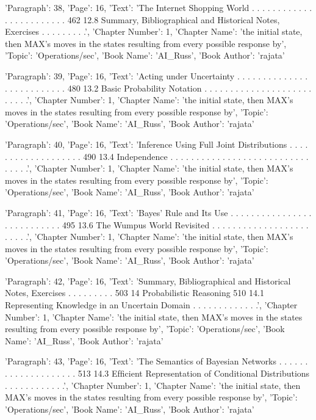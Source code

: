 {'Paragraph': 38, 'Page': 16, 'Text': 'The Internet Shopping World . . . . . . . . . . . . . . . . . . . . . . . . 462 12.8 Summary, Bibliographical and Historical Notes, Exercises . . . . . . . . .', 'Chapter Number': 1, 'Chapter Name': 'the initial state, then MAX’s moves in the states resulting from every possible response by', 'Topic': 'Operations/sec', 'Book Name': 'AI_Russ', 'Book Author': 'rajata'}

{'Paragraph': 39, 'Page': 16, 'Text': 'Acting under Uncertainty . . . . . . . . . . . . . . . . . . . . . . . . . . 480 13.2 Basic Probability Notation . . . . . . . . . . . . . . . . . . . . . . . . . .', 'Chapter Number': 1, 'Chapter Name': 'the initial state, then MAX’s moves in the states resulting from every possible response by', 'Topic': 'Operations/sec', 'Book Name': 'AI_Russ', 'Book Author': 'rajata'}

{'Paragraph': 40, 'Page': 16, 'Text': 'Inference Using Full Joint Distributions . . . . . . . . . . . . . . . . . . . 490 13.4 Independence . . . . . . . . . . . . . . . . . . . . . . . . . . . . . . . .', 'Chapter Number': 1, 'Chapter Name': 'the initial state, then MAX’s moves in the states resulting from every possible response by', 'Topic': 'Operations/sec', 'Book Name': 'AI_Russ', 'Book Author': 'rajata'}

{'Paragraph': 41, 'Page': 16, 'Text': 'Bayes’ Rule and Its Use . . . . . . . . . . . . . . . . . . . . . . . . . . . 495 13.6 The Wumpus World Revisited . . . . . . . . . . . . . . . . . . . . . . . .', 'Chapter Number': 1, 'Chapter Name': 'the initial state, then MAX’s moves in the states resulting from every possible response by', 'Topic': 'Operations/sec', 'Book Name': 'AI_Russ', 'Book Author': 'rajata'}

{'Paragraph': 42, 'Page': 16, 'Text': 'Summary, Bibliographical and Historical Notes, Exercises . . . . . . . . . 503 14 Probabilistic Reasoning 510 14.1 Representing Knowledge in an Uncertain Domain . . . . . . . . . . . . .', 'Chapter Number': 1, 'Chapter Name': 'the initial state, then MAX’s moves in the states resulting from every possible response by', 'Topic': 'Operations/sec', 'Book Name': 'AI_Russ', 'Book Author': 'rajata'}

{'Paragraph': 43, 'Page': 16, 'Text': 'The Semantics of Bayesian Networks . . . . . . . . . . . . . . . . . . . . 513 14.3 Efﬁcient Representation of Conditional Distributions . . . . . . . . . . . .', 'Chapter Number': 1, 'Chapter Name': 'the initial state, then MAX’s moves in the states resulting from every possible response by', 'Topic': 'Operations/sec', 'Book Name': 'AI_Russ', 'Book Author': 'rajata'}

